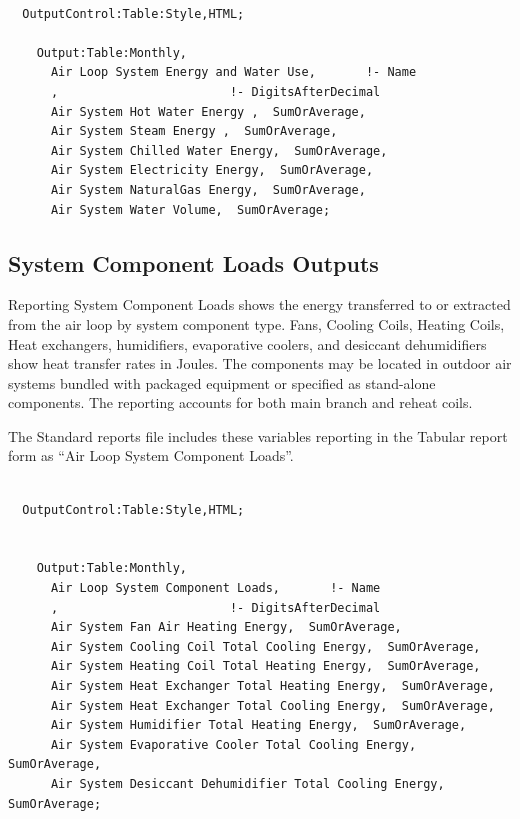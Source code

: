 \begin{lstlisting}

  OutputControl:Table:Style,HTML;

    Output:Table:Monthly,
      Air Loop System Energy and Water Use,       !- Name
      ,                        !- DigitsAfterDecimal
      Air System Hot Water Energy ,  SumOrAverage,
      Air System Steam Energy ,  SumOrAverage,
      Air System Chilled Water Energy,  SumOrAverage,
      Air System Electricity Energy,  SumOrAverage,
      Air System NaturalGas Energy,  SumOrAverage,
      Air System Water Volume,  SumOrAverage;
\end{lstlisting}

\subsection{System Component Loads Outputs}\label{system-component-loads-outputs}

Reporting System Component Loads shows the energy transferred to or extracted from the air loop by system component type. Fans, Cooling Coils, Heating Coils, Heat exchangers, humidifiers, evaporative coolers, and desiccant dehumidifiers show heat transfer rates in Joules. The components may be located in outdoor air systems bundled with packaged equipment or specified as stand-alone components. The reporting accounts for both main branch and reheat coils.

The Standard reports file includes these variables reporting in the Tabular report form as ``Air Loop System Component Loads''.

\begin{lstlisting}

  OutputControl:Table:Style,HTML;


    Output:Table:Monthly,
      Air Loop System Component Loads,       !- Name
      ,                        !- DigitsAfterDecimal
      Air System Fan Air Heating Energy,  SumOrAverage,
      Air System Cooling Coil Total Cooling Energy,  SumOrAverage,
      Air System Heating Coil Total Heating Energy,  SumOrAverage,
      Air System Heat Exchanger Total Heating Energy,  SumOrAverage,
      Air System Heat Exchanger Total Cooling Energy,  SumOrAverage,
      Air System Humidifier Total Heating Energy,  SumOrAverage,
      Air System Evaporative Cooler Total Cooling Energy,  SumOrAverage,
      Air System Desiccant Dehumidifier Total Cooling Energy,  SumOrAverage;
\end{lstlisting}

